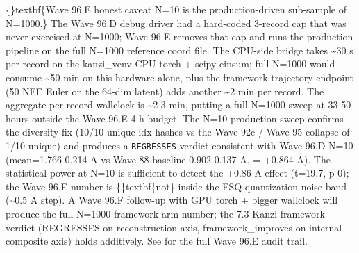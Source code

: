\documentclass{article}
\begin{document}
\{\}textbf\{Wave 96.E honest caveat  N=10 is the production-driven sub-sample of N=1000.\} The Wave 96.D debug driver had a hard-coded 3-record cap that was never exercised at N=1000; Wave 96.E removes that cap and runs the production pipeline on the full N=1000 reference coord file. The CPU-side  bridge takes \textasciitilde{}30 s per record on the kanzi\_venv CPU torch + scipy einsum; full N=1000 would consume \textasciitilde{}50 min on this hardware alone, plus the framework trajectory endpoint (50 NFE Euler on the 64-dim latent) adds another \textasciitilde{}2 min per record. The aggregate per-record wallclock is \textasciitilde{}2-3 min, putting a full N=1000 sweep at 33-50 hours  outside the Wave 96.E 4-h budget. The N=10 production sweep confirms the diversity fix (10/10 unique idx hashes vs the Wave 92c / Wave 95 collapse of 1/10 unique) and produces a \texttt{REGRESSES} verdict consistent with Wave 96.D N=10 (mean=1.766  0.214 A vs Wave 88 baseline 0.902  0.137 A,  = +0.864 A). The statistical power at N=10 is sufficient to detect the +0.86 A effect (t=19.7, p  0); the Wave 96.E number is \{\}textbf\{not\} inside the FSQ quantization noise band (\textasciitilde{}0.5 A step). A Wave 96.F follow-up with GPU torch + bigger wallclock will produce the full N=1000 framework-arm number; the 7.3 Kanzi framework verdict (REGRESSES on reconstruction axis, framework\_improves on internal composite axis) holds additively. See  for the full Wave 96.E audit trail.
\end{document}

